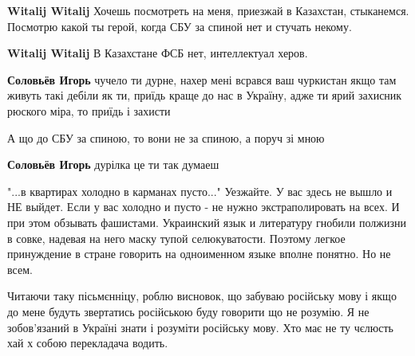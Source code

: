 \begin{itemize}
\begin{itemize}
\textbf{Witalij Witalij} Хочешь посмотреть на меня, приезжай в Казахстан, стыканемся. Посмотрю какой ты герой, когда СБУ за спиной нет и стучать некому.


\textbf{Witalij Witalij} В Казахстане ФСБ нет, интеллектуал херов.


\textbf{Соловьёв Игорь} чучело ти дурне, нахер мені всрався ваш чуркистан якщо там живуть такі дебіли як ти, приїдь краще до нас в Україну, адже ти ярий захисник рюского міра, то приїдь і захисти🤣🤣🤣🤣


А що до СБУ за спиною, то вони не за спиною, а поруч зі мною🤣🤣🤣🤣


\textbf{Соловьёв Игорь} дурілка це ти так думаеш🤣🤣🤣🤣
\end{itemize}



"...в квартирах холодно в карманах пусто..." Уезжайте. У вас здесь не вышло и
НЕ выйдет. Если у вас холодно и пусто - не нужно экстраполировать на всех. И
при этом обзывать фашистами. Украинский язык и литературу гнобили полжизни в
совке, надевая на него маску тупой селюкуватости. Поэтому легкое принуждение в
стране говорить на одноименном языке вполне понятно. Но не всем.




Читаючи таку пісьмєнніцу, роблю висновок, що забуваю російську мову і якщо до
мене будуть звертатись російською буду говорити що не розумію. Я не
зобов'язаний в Україні знати і розуміти російську мову. Хто має не ту чєлюсть
хай х собою перекладача водить.

\begin{itemize}


\end{itemize}
\end{itemize}
